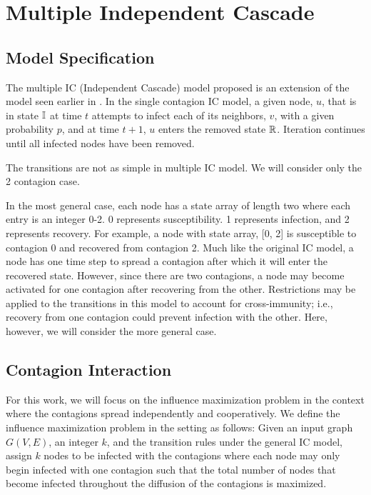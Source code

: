 \documentclass[11pt]{article}
\begin{document}
\section{Multiple Independent Cascade}

\subsection{Model Specification}

The multiple IC (Independent Cascade) model proposed is an extension of the model seen earlier in \cite{KKT_Greedy}. In the single contagion IC model, a given node, $u$, that is in state $\mbox{$\mathbb{I}$}{}$ at time $t$ attempts to infect each of its neighbors, $v$, with a given probability $p$, and at time $t+1$, $u$ enters the removed state $\mbox{$\mathbb{R}$}{}$. Iteration continues until all infected nodes have been removed. 

The transitions are not as simple in multiple IC model. We will consider only the 2 contagion case.

In the most general case, each node has a state array of length two where each entry is an integer 0-2. 0 represents susceptibility. 1 represents infection, and 2 represents recovery. For example, a node with state array, [0, 2] is susceptible to contagion 0 and recovered from contagion 2. Much like the original IC model, a node has one time step to spread a contagion after which it will enter the recovered state. However, since there are two contagions, a node may become activated for one contagion after recovering from the other. Restrictions may be applied to the transitions in this model to account for cross-immunity; i.e., recovery from one contagion could prevent infection with the other. Here, however, we will consider the more general case. 

\subsection{Contagion Interaction}

For this work, we will focus on the influence maximization problem in the context where the contagions spread independently and cooperatively. We define the influence maximization problem in the setting as follows: Given an input graph $G(V,E)$, an integer $k$, and the transition rules under the general IC model, assign $k$ nodes to be infected with the contagions where each node may only begin infected with one contagion such that the total number of nodes that become infected throughout the diffusion of the contagions is maximized. 
\end{document}
